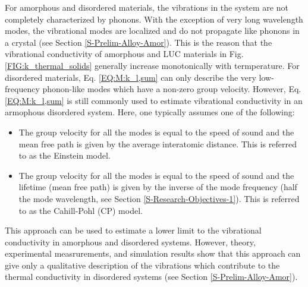 \documentclass[letterpaper,12pt]{article}
\begin{document}
For amorphous and disordered materials, the vibrations in the system are not completely characterized by phonons. With the exception of very long wavelength modes, the vibrational modes are localized and do not propagate like
phonons in a crystal (see Section \ref{S-Prelim-Alloy-Amor}). This is the reason that the vibrational conductivity of amorphous and LUC materials in Fig. \ref{FIG:k_thermal_solids} generally increase monotonically with termperature.  For disordered materials, Eq$.$ \eqref{EQ:M:k_l,sum} can only describe the very low-frequency phonon-like modes which have a non-zero group velocity.  However, Eq$.$ \eqref{EQ:M:k_l,sum} is still commonly used to estimate vibrational conductivity in an armophous disordered system. Here, one typically assumes one of the following: 
\begin{itemize}
\item The group velocity for all the modes is
equal to the speed of sound and the mean free path is given
by the average interatomic distance. \cite{einstein1911,kittel1949} This is referred to as the Einstein model.

\item The group velocity for all the modes is
equal to the speed of sound and the lifetime (mean free path) is given
by the inverse of the mode frequency (half the mode wavelength, see Section \ref{S-Research-Objectives-1}).\cite{cahill1992} This is referred to as the Cahill-Pohl (CP) model.
\end{itemize}

This approach can be used to estimate a lower limit to the vibrational conductivity in amorphous and disordered systems.\cite{cahill1987,cahill1992} However, theory\cite{allen1993}, experimental measrurements\cite{PhysRevB.34.5696}, and simulation results\cite{shenogin2009} show that this approach can give only a qualitative description of the vibrations which contribute to the thermal conductivity in disordered systems (see Section \ref{S-Prelim-Alloy-Amor}).
\end{document}
